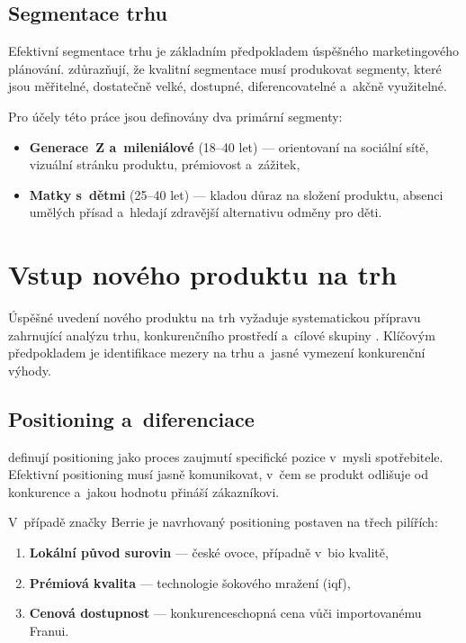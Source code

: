 \subsection{Segmentace trhu}

Efektivní segmentace trhu je základním předpokladem úspěšného marketingového plánování. \textcite{dibb_simkin_2010} zdůrazňují, že kvalitní segmentace musí produkovat segmenty, které jsou měřitelné, dostatečně velké, dostupné, diferencovatelné a~akčně využitelné.

Pro účely této práce jsou definovány dva primární segmenty:
\begin{itemize}
  \item \textbf{Generace~Z a~mileniálové} (18--40 let) — orientovaní na sociální sítě, vizuální stránku produktu, prémiovost a~zážitek,
  \item \textbf{Matky s~dětmi} (25--40 let) — kladou důraz na složení produktu, absenci umělých přísad a~hledají zdravější alternativu odměny pro děti.
\end{itemize}

\section{Vstup nového produktu na trh}
\label{sec:theory_market_entry}

Úspěšné uvedení nového produktu na trh vyžaduje systematickou přípravu zahrnující analýzu trhu, konkurenčního prostředí a~cílové skupiny \parencite{kotler_keller_2016}. Klíčovým předpokladem je identifikace mezery na trhu a~jasné vymezení konkurenční výhody.

\subsection{Positioning a~diferenciace}

\textcite{ries_trout_2001} definují positioning jako proces zaujmutí specifické pozice v~mysli spotřebitele. Efektivní positioning musí jasně komunikovat, v~čem se produkt odlišuje od konkurence a~jakou hodnotu přináší zákazníkovi.

V~případě značky Berrie je navrhovaný positioning postaven na třech pilířích:
\begin{enumerate}
  \item \textbf{Lokální původ surovin} — české ovoce, případně v~\gls{bio} kvalitě,
  \item \textbf{Prémiová kvalita} — technologie šokového mražení (\gls{iqf}),
  \item \textbf{Cenová dostupnost} — konkurenceschopná cena vůči importovanému Franui.
\end{enumerate}

